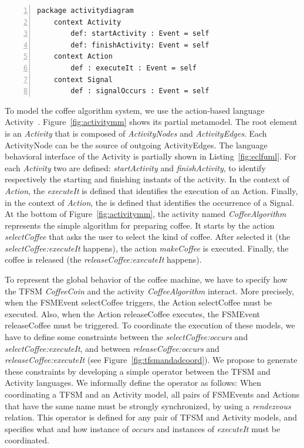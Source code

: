	\begin{lstlisting}[language=ecl,
	caption={Partial \ecl specification of Activity Diagram},
	label={fig:eclfuml}, 
	basicstyle=\scriptsize\ttfamily, backgroundcolor=\color{LGrey}, numbers=left, xleftmargin=3pt, belowskip=-0.4em]
	package activitydiagram
	context Activity
		def: startActivity : Event = self
		def: finishActivity: Event = self
	context Action
		def : executeIt : Event = self
	context Signal
		def : signalOccurs : Event = self
	\end{lstlisting}
To model the coffee algorithm system, we use the action-based language Activity~\cite{ttc15bib}. Figure~\ref{fig:activitymm} shows its partial metamodel. The root element is an \emph{Activity} that is composed of \emph{ActivityNodes} and \emph{ActivityEdges}. Each ActivityNode can be the source of outgoing ActivityEdges. The language behavioral interface of the Activity is partially shown in Listing~\ref{fig:eclfuml}. For each \emph{Activity} two \dse are defined: \emph{startActivity} and \emph{finishActivity}, to identify respectively the starting and finishing instants of the activity. In the context of \emph{Action}, the \dse \emph{executeIt} is defined that identifies the execution of an Action. Finally, in the context of \emph{Action}, the  is defined that identifies the occurrence of a Signal. At the bottom of Figure~\ref{fig:activitymm}, the activity named \emph{CoffeeAlgorithm} represents the simple algorithm for preparing coffee. It starts by the action \emph{selectCoffee} that asks the user to select the kind of coffee. After selected it (the \mse \emph{selectCoffee:executeIt} happens), the action \emph{makeCoffee} is executed. Finally, the coffee is released (the \mse \emph{releaseCoffee:executeIt} happens).

To represent the global behavior of the coffee machine, we have to specify how the TFSM \emph{CoffeeCoin} and the activity \emph{CoffeeAlgorithm} interact. More precisely, when the FSMEvent selectCoffee triggers, the Action selectCoffee must be executed. Also, when the Action releaseCoffee executes, the FSMEvent releaseCoffee must be triggered. To coordinate the execution of these models, we have to define some constraints between the \mse \emph{selectCoffee:occurs} and \emph{selectCoffee:executeIt}, and between \emph{releaseCoffee:occurs} and \emph{releaseCoffee:executeIt} (see Figure~\ref{fig:tfsmandadcoord}). We propose to generate these constraints by developing a simple \bcool operator between the TFSM and Activity languages. We informally define the operator as follows: When coordinating a TFSM and an Activity model, all pairs of FSMEvents and Actions that have the same name must be strongly synchronized, \ie by using a \emph{rendezvous} relation. This operator is defined for any pair of TFSM and Activity models, and specifies what and how instance of \dse \emph{occurs} and instances of \dse \emph{executeIt} must be coordinated. 

